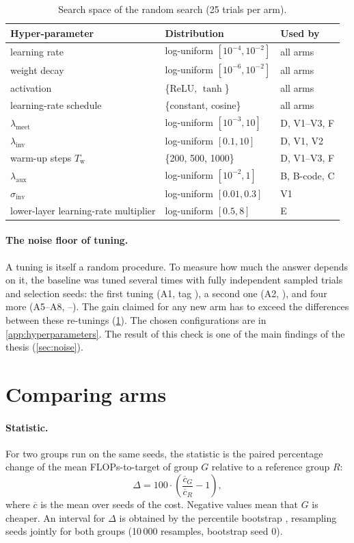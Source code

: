 \begin{table}[t]
\centering\small
\caption{Search space of the random search (25 trials per arm).}
\label{tab:space}
\begin{tabular}{@{}l l l@{}}
\toprule
Hyper-parameter & Distribution & Used by\\
\midrule
learning rate & log-uniform $[10^{-4},10^{-2}]$ & all arms\\
weight decay & log-uniform $[10^{-6},10^{-2}]$ & all arms\\
activation & \{ReLU, $\tanh$\} & all arms\\
learning-rate schedule & \{constant, cosine\} & all arms\\
$\lambda_{\mathrm{meet}}$ & log-uniform $[10^{-3},10]$ & D, V1--V3, F\\
$\lambda_{\mathrm{inv}}$ & log-uniform $[0.1,10]$ & D, V1, V2\\
warm-up steps $T_{\mathrm{w}}$ & \{200, 500, 1000\} & D, V1--V3, F\\
$\lambda_{\mathrm{aux}}$ & log-uniform $[10^{-2},1]$ & B, B-code, C\\
$\sigma_{\mathrm{inv}}$ & log-uniform $[0.01,0.3]$ & V1\\
lower-layer learning-rate multiplier & log-uniform $[0.5,8]$ & E\\
\bottomrule
\end{tabular}
\end{table}

\paragraph{The noise floor of tuning.} A tuning is itself a random procedure. To measure how much the answer depends on it, the baseline was tuned several times with fully independent sampled trials and selection seeds: the first tuning (A1, tag ), a second one (A2, ), and four more (A5--A8, --). The gain claimed for any new arm has to exceed the differences between these re-tunings (\cref{sec:stats}). The chosen configurations are in \cref{app:hyperparameters}. The result of this check is one of the main findings of the thesis (\cref{sec:noise}).

\section{Comparing arms}\label{sec:stats}
\paragraph{Statistic.} For two groups run on the same seeds, the statistic is the paired percentage change of the mean FLOPs-to-target of group $G$ relative to a reference group $R$:
\begin{equation}
\Delta = 100\cdot\left(\frac{\overline{c}_G}{\overline{c}_R}-1\right),
\end{equation}
where $\overline{c}$ is the mean over seeds of the cost. Negative values mean that $G$ is cheaper. An interval for $\Delta$ is obtained by the percentile bootstrap \citep{efron1993introduction}, resampling seeds jointly for both groups (10\,000 resamples, bootstrap seed 0).

